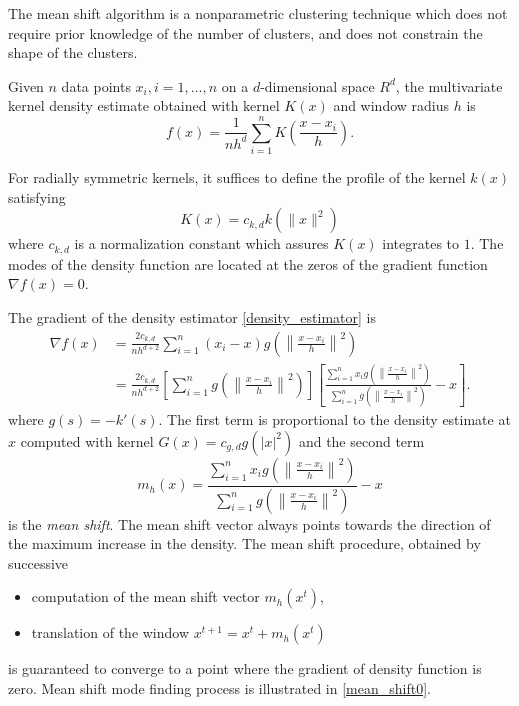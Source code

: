 
The mean shift algorithm is a nonparametric clustering technique which does not
require prior knowledge of the number of clusters, and does not constrain the
shape of the clusters. 

Given $n$ data points $x_i, i = 1, ... , n$ on a
$d$-dimensional space $R^d$, the multivariate kernel density estimate obtained
with kernel $K(x)$ and window radius $h$ is
\begin{equation}\label{density_estimator}
	f(x)=\frac{1}{nh^d}\sum_{i=1}^n K(\frac{x-x_i}{h}).
\end{equation}

For radially symmetric kernels, it suffices to define the profile of the kernel
$k(x)$ satisfying
\begin{equation}
	K(x)=c_{k,d}k(\lVert x \rVert^2)
\end{equation}
where $c_{k,d}$ is a normalization constant which assures $K(x)$ integrates to 
$1$. The modes of the density function are located at the zeros of the gradient
function  $\nabla f(x) = 0$.

The gradient of the density estimator \eqref{density_estimator} is 
\begin{equation}
	\begin{split}
		\nabla f(x) & = \frac{2c_{k,d}}{nh^{d+2}}\sum_{i=1}^n \left(x_i - x\right)g\left(\left\lVert \frac{x - x_i}{h} \right\rVert^2\right) \\
		& = \frac{2c_{k,d}}{nh^{d+2}} \left[ \sum_{i=1}^n g\left(\left\lVert \frac{x - x_i}{h} \right\rVert^2\right) \right]
		\left[ \frac{\sum_{i=1}^n x_i g\left(\left\lVert \frac{x - x_i}{h} \right\rVert^2\right)}{\sum_{i=1}^n g\left(\left\lVert \frac{x - x_i}{h} \right\rVert^2\right)} -x \right].
	\end{split}
\end{equation}
where $g(s) = -k'(s)$. The first term is proportional to the density estimate at
$x$ computed with kernel $G(x) = c_{g,d}g(\lvert x \rvert^2)$ and the second 
term
\begin{equation}
	m_h(x) = \frac{\sum_{i=1}^n x_i g\left(\left\lVert \frac{x - x_i}{h} \right\rVert^2\right)}{\sum_{i=1}^n g\left(\left\lVert \frac{x - x_i}{h} \right\rVert^2\right)} -x
\end{equation}
is the \emph{mean shift}. The mean shift vector always points towards the direction of the maximum increase in the density. The mean shift procedure, obtained by successive
\begin{itemize}
	\item computation of the mean shift vector $m_h(x^t)$,
	\item translation of the window $x^{t+1} = x^t + m_h(x^t)$
\end{itemize}
is guaranteed to converge to a point where the gradient of density function is
zero. Mean shift mode finding process is illustrated in \autoref{mean_shift0}.

